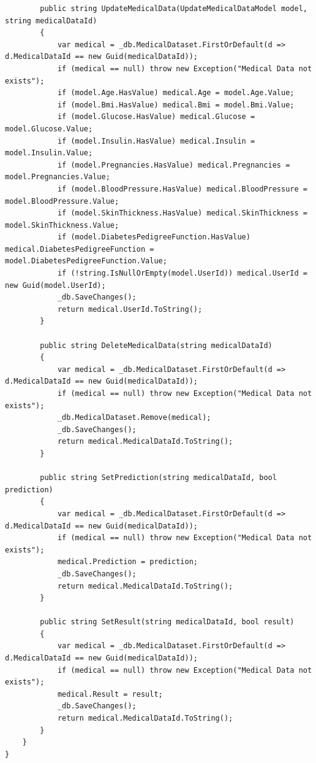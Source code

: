 \documentclass[12pt,a4paper]{article}
\begin{document}
\begin{lstlisting}
        public string UpdateMedicalData(UpdateMedicalDataModel model, string medicalDataId)
        {
            var medical = _db.MedicalDataset.FirstOrDefault(d => d.MedicalDataId == new Guid(medicalDataId));
            if (medical == null) throw new Exception("Medical Data not exists");
            if (model.Age.HasValue) medical.Age = model.Age.Value;
            if (model.Bmi.HasValue) medical.Bmi = model.Bmi.Value;
            if (model.Glucose.HasValue) medical.Glucose = model.Glucose.Value;
            if (model.Insulin.HasValue) medical.Insulin = model.Insulin.Value;
            if (model.Pregnancies.HasValue) medical.Pregnancies = model.Pregnancies.Value;
            if (model.BloodPressure.HasValue) medical.BloodPressure = model.BloodPressure.Value;
            if (model.SkinThickness.HasValue) medical.SkinThickness = model.SkinThickness.Value;
            if (model.DiabetesPedigreeFunction.HasValue) medical.DiabetesPedigreeFunction = model.DiabetesPedigreeFunction.Value;
            if (!string.IsNullOrEmpty(model.UserId)) medical.UserId = new Guid(model.UserId);
            _db.SaveChanges();
            return medical.UserId.ToString();
        }

        public string DeleteMedicalData(string medicalDataId)
        {
            var medical = _db.MedicalDataset.FirstOrDefault(d => d.MedicalDataId == new Guid(medicalDataId));
            if (medical == null) throw new Exception("Medical Data not exists");
            _db.MedicalDataset.Remove(medical);
            _db.SaveChanges();
            return medical.MedicalDataId.ToString();
        }

        public string SetPrediction(string medicalDataId, bool prediction)
        {
            var medical = _db.MedicalDataset.FirstOrDefault(d => d.MedicalDataId == new Guid(medicalDataId));
            if (medical == null) throw new Exception("Medical Data not exists");
            medical.Prediction = prediction;
            _db.SaveChanges();
            return medical.MedicalDataId.ToString();
        }

        public string SetResult(string medicalDataId, bool result)
        {
            var medical = _db.MedicalDataset.FirstOrDefault(d => d.MedicalDataId == new Guid(medicalDataId));
            if (medical == null) throw new Exception("Medical Data not exists");
            medical.Result = result;
            _db.SaveChanges();
            return medical.MedicalDataId.ToString();
        }
    }
}
	\end{lstlisting}
\end{document}
